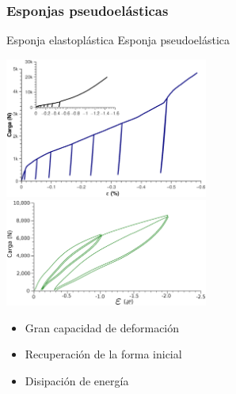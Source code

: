 \documentclass[usenames,dvipsnames]{beamer}
\begin{document}
\begin{frame}

\frametitle{Esponjas pseudoelásticas}


%  
\vspace{-.5cm}
\begin{tiny}
\hspace{2cm} Esponja elastoplástica  \hspace{2.5cm} Esponja pseudoelástica
\end{tiny}

\includegraphics[width=0.5\textwidth]{img/intro/Cucompararesponja.eps}
\includegraphics[width=0.5\textwidth]{img/intro/Graph533b.eps}

 \begin{itemize}
  \item {Gran capacidad de deformación}
  \item {Recuperación de la forma inicial}
  \item {Disipación de energía}
 \end{itemize}

\end{frame}
\end{document}
